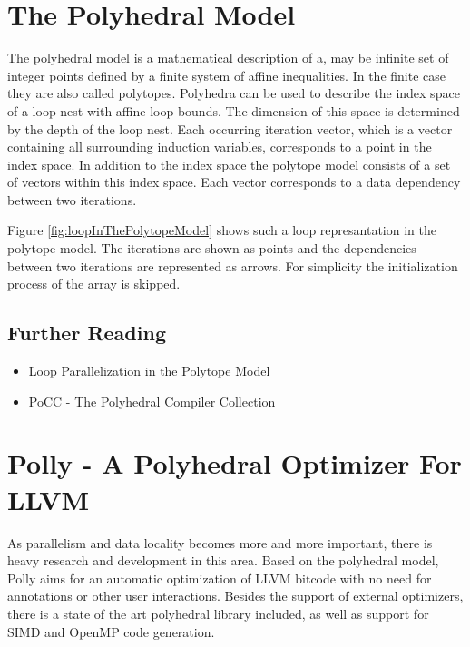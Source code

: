 

\section{The Polyhedral Model}
The polyhedral model is a mathematical description of a, may be infinite set of 
integer points defined by a finite system of affine inequalities. 
In the finite case they are also called polytopes.
Polyhedra can be used to describe the index space of a loop nest with 
affine loop bounds. The dimension of this space is determined by the depth of 
the loop nest. Each occurring iteration vector, which is a vector 
containing all surrounding induction variables, corresponds to a point in the 
index space. In addition to the index space the polytope model consists of a 
set of vectors within this index space. Each vector corresponds to a data
dependency between two iterations.

Figure \ref{fig:loopInThePolytopeModel} shows such a loop represantation in the 
polytope model. The iterations are shown as points and
the dependencies between two iterations are represented as arrows. 
For simplicity the initialization process of the array is skipped.

\subsection*{Further Reading}
\begin{itemize}
  \item Loop Parallelization in the Polytope Model \cite{Lengauer93loopparallelization}  
  \item PoCC - The Polyhedral Compiler Collection \cite{PoCC:Online}
\end{itemize}


\section{Polly - A Polyhedral Optimizer For LLVM}
\label{Polly}
As parallelism and data locality becomes more and more important, 
there is heavy research and development in this area.
Based on the polyhedral 
model, Polly aims for an automatic optimization of
LLVM bitcode with no need for annotations or other user interactions.
Besides the support of external optimizers, there is a 
state of the art polyhedral library included, as well as support for SIMD and 
OpenMP code generation\cite{raghesh2011framework}. 

